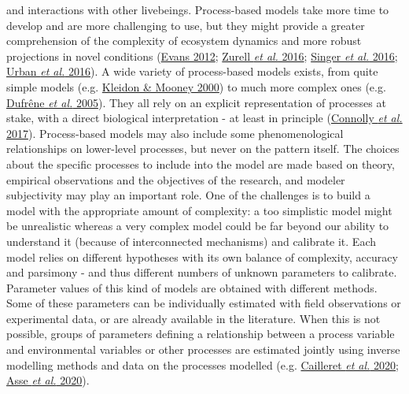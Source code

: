 \documentclass[11pt,]{article}
\begin{document}
and interactions with other livebeings. Process-based models take more
time to develop and are more challenging to use, but they might provide
a greater comprehension of the complexity of ecosystem dynamics and more
robust projections in novel conditions
(\protect\hyperlink{ref-Evans2012}{Evans 2012};
\protect\hyperlink{ref-Zurell2016}{Zurell \emph{et al.} 2016};
\protect\hyperlink{ref-Singer2016}{Singer \emph{et al.} 2016};
\protect\hyperlink{ref-Urban2016}{Urban \emph{et al.} 2016}). A wide
variety of process-based models exists, from quite simple models (e.g.
\protect\hyperlink{ref-Kleidon2000}{Kleidon \& Mooney 2000}) to much
more complex ones (e.g. \protect\hyperlink{ref-Dufrene2005}{Dufrêne
\emph{et al.} 2005}). They all rely on an explicit representation of
processes at stake, with a direct biological interpretation - at least
in principle (\protect\hyperlink{ref-Connolly2017}{Connolly \emph{et
al.} 2017}). Process-based models may also include some phenomenological
relationships on lower-level processes, but never on the pattern itself.
The choices about the specific processes to include into the model are
made based on theory, empirical observations and the objectives of the
research, and modeler subjectivity may play an important role. One of
the challenges is to build a model with the appropriate amount of
complexity: a too simplistic model might be unrealistic whereas a very
complex model could be far beyond our ability to understand it (because
of interconnected mechanisms) and calibrate it. Each model relies on
different hypotheses with its own balance of complexity, accuracy and
parsimony - and thus different numbers of unknown parameters to
calibrate. Parameter values of this kind of models are obtained with
different methods. Some of these parameters can be individually
estimated with field observations or experimental data, or are already
available in the literature. When this is not possible, groups of
parameters defining a relationship between a process variable and
environmental variables or other processes are estimated jointly using
inverse modelling methods and data on the processes modelled (e.g.
\protect\hyperlink{ref-Cailleret2020}{Cailleret \emph{et al.} 2020};
\protect\hyperlink{ref-Asse2020}{Asse \emph{et al.} 2020}).
\end{document}
